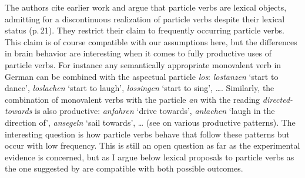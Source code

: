 \begin{exe}
\begin{xlist}[iv.]
\begin{exe}
\begin{xlist}[iv.]
The authors cite earlier work \citep*{CSP2010a} and argue that particle verbs are lexical objects,
admitting for a discontinuous realization of particle verbs despite their lexical status
(p.\,21). They restrict their claim to frequently occurring particle verbs. This claim is of course
compatible with our assumptions here, but the differences in brain behavior are interesting when it
comes to fully productive uses of particle verbs. For instance any semantically appropriate monovalent verb in German can
be combined with the aspectual particle \emph{los}: \emph{lostanzen} `start to dance',
\emph{loslachen} `start to laugh', \emph{lossingen} `start to sing', \ldots. Similarly, the
combination of monovalent verbs with the particle \emph{an} with the reading \emph{directed-towards} is
also productive: \emph{anfahren} `drive towards', \emph{anlachen} `laugh in the direction of',
\emph{ansegeln} `sail towards', \ldots{} (see  on various productive
patterns). 
The interesting question is how particle verbs behave that follow these patterns but occur with low
frequency. This is still an open question as far as the experimental evidence is concerned, but as
I argue below lexical proposals to particle verbs as the one suggested by \citet{Mueller2003a} are
compatible with both possible outcomes.


\end{xlist}
\end{exe}
\end{xlist}
\end{exe}
